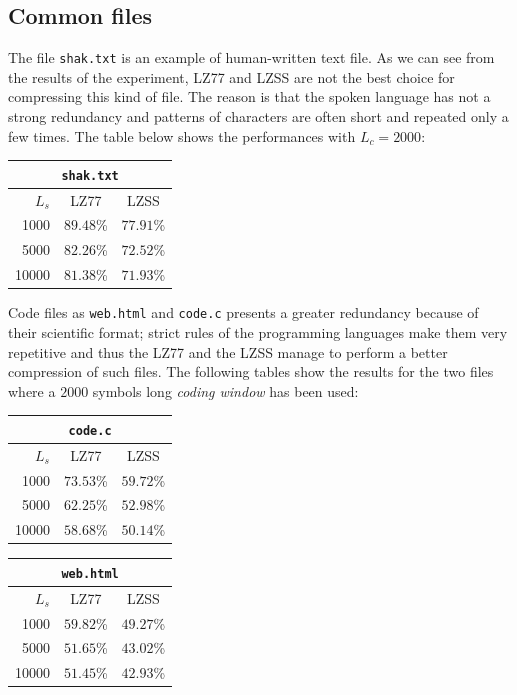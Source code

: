 \subsection{Common files}
The file \texttt{shak.txt} is an example of human-written text file. As we can see from the results of the experiment, LZ77 and LZSS are not the best choice for compressing this kind of file. The reason is that the spoken language has not a strong redundancy and patterns of characters are often short and repeated only a few times. The table below shows the performances with $L_c = 2000$:
\begin{center}
\begin{tabular}{r | c | c |}
\multicolumn{3}{c|}{\texttt{shak.txt}} \\ 
\hline
$L_s$ & LZ77 & LZSS \\ \hline
1000 & $89.48$\% & $77.91$\% \\
5000& $82.26$\% & $72.52$\% \\
10000& $81.38$\% & $71.93$\% \\
\hline
\end{tabular}
\end{center}

Code files as \texttt{web.html} and \texttt{code.c} presents a greater redundancy because of their scientific format; strict rules of the programming languages make them very repetitive and thus the LZ77 and the LZSS manage to perform a better compression of such files. The following tables show the results for the two files where a $2000$ symbols long \textit{coding window} has been used:
\begin{center}
\begin{tabular}{r | c | c |}
\multicolumn{3}{c|}{\texttt{code.c}} \\
\hline
$L_s$ & LZ77 & LZSS \\ \hline
1000 & $73.53$\% & $59.72$\% \\
5000& $62.25$\% & $52.98$\% \\
10000& $58.68$\% & $50.14$\% \\
\hline
\end{tabular}

\vspace{0.5cm}

\begin{tabular}{r | c | c |}
\multicolumn{3}{c|}{\texttt{web.html}} \\
\hline
$L_s$ & LZ77 & LZSS \\ \hline
1000 & $59.82$\% & $49.27$\% \\
5000& $51.65$\% & $43.02$\% \\
10000& $51.45$\% & $42.93$\% \\
\hline
\end{tabular}
\end{center}

